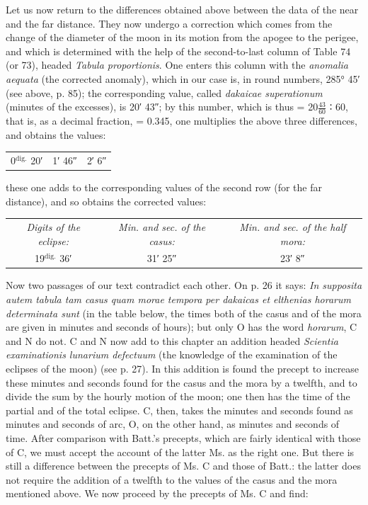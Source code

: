 \documentclass[11pt]{article}
\newcommand{\Pg}[1]{\marginpar{\footnotesize\color{gray}#1}}
\begin{document}
\par Let us now return to the differences obtained above between the data of the near and the far distance. They now undergo a correction which comes from the change of the diameter of the moon in its motion from the apogee to the perigee, and which is determined with the help of the second-to-last column of Table 74 (or 73), headed \emph{Tabula proportionis}. One enters this column with the \emph{anomalia aequata} (the corrected anomaly), which in our case is, in round numbers, 285° 45′ (see above, p. 85); the corresponding value, called \emph{dakaicae superationum} (minutes of the excesses), is 20′ 43″; by this number, which is thus = 20$\tfrac{43}{60}$ {\SignFont\upshape ∶} 60, that is, as a decimal fraction, = 0.345, one multiplies the above three differences, and obtains the values:\par
\begin{center}\small\begin{tabular}{ccc}
0$^{\text{dig.}}$ 20′ & 1′ 46″ & 2′ 6″ \\
\end{tabular}\end{center}
\par these one adds to the corresponding values of the second row (for the far distance), and so obtains the corrected values:\par
\begin{center}\small\begin{tabular}{ccc}
\emph{Digits of the eclipse:} & \emph{Min. and sec. of the casus:} & \emph{Min. and sec. of the half mora:} \\
19$^{\text{dig.}}$ 36′ & 31′ 25″ & 23′ 8″ \\
\end{tabular}\end{center}
\par \Pg{89}Now two passages of our text contradict each other. On p. 26 it says: \emph{In supposita autem tabula tam casus quam morae tempora per dakaicas et elthenias horarum determinata sunt} (in the table below, the times both of the casus and of the mora are given in minutes and seconds of hours); but only O has the word \emph{horarum}, C and N do not. C and N now add to this chapter an addition headed \emph{Scientia examinationis lunarium defectuum} (the knowledge of the examination of the eclipses of the moon) (see p. 27). In this addition is found the precept to increase these minutes and seconds found for the casus and the mora by a twelfth, and to divide the sum by the hourly motion of the moon; one then has the time of the partial and of the total eclipse. C, then, takes the minutes and seconds found as minutes and seconds of arc, O, on the other hand, as minutes and seconds of time. After comparison with Batt.'s precepts, which are fairly identical with those of C, we must accept the account of the latter Ms. as the right one. But there is still a difference between the precepts of Ms. C and those of Batt.: the latter does not require the addition of a twelfth to the values of the casus and the mora mentioned above. We now proceed by the precepts of Ms. C and find:\par
\end{document}
